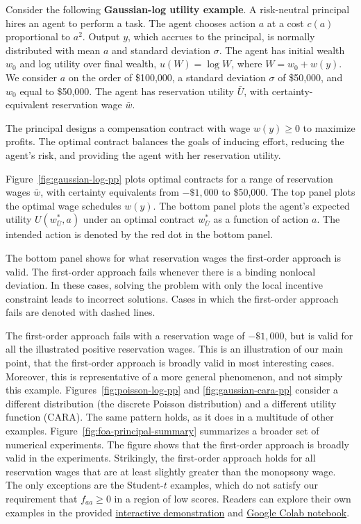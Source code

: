 Consider the following \textbf{Gaussian-log utility example}. A risk-neutral principal hires an agent to perform a task. The agent chooses action $a$ at a cost $c(a)$ proportional to $a^2$. Output $y$, which accrues to the principal, is normally distributed with mean $a$ and standard deviation $\sigma$. The agent has initial wealth $w_0$ and log utility over final wealth, $u(W)=\log W$, where $W=w_0+w(y)$. We consider $a$ on the order of \$100{,}000, a standard deviation $\sigma$ of \$50{,}000, and $w_0$ equal to \$50{,}000. The agent has reservation utility $\bar U$, with certainty-equivalent reservation wage $\bar w$.

The principal designs a compensation contract with wage $w(y) \geq 0$ to maximize profits. The optimal contract balances the goals of inducing effort, reducing the agent's risk, and providing the agent with her reservation utility.

Figure~\ref{fig:gaussian-log-pp} plots optimal contracts for a range of reservation wages $\bar w$, with certainty equivalents from $-\$1,000$ to \$50,000. The top panel plots the optimal wage schedules $w(y)$. The bottom panel plots the agent's expected utility $U(w^*_{\bar U},a)$ under an optimal contract $w^*_{\bar U}$ as a function of action $a$. The intended action is denoted by the red dot in the bottom panel.

The bottom panel shows for what reservation wages the first-order approach is valid. The first-order approach fails whenever there is a binding nonlocal deviation. In these cases, solving the problem with only the local incentive constraint leads to incorrect solutions. Cases in which the first-order approach fails are denoted with dashed lines.

The first-order approach fails with a reservation wage of $-\$1,000$, but is valid for all the illustrated positive reservation wages. This is an illustration of our main point, that the first-order approach is broadly valid in most interesting cases. Moreover, this is representative of a more general phenomenon, and not simply this example. Figures~\ref{fig:poisson-log-pp} and \ref{fig:gaussian-cara-pp} consider a different distribution (the discrete Poisson distribution) and a different utility function (CARA). The same pattern holds, as it does in a multitude of other examples. Figure~\ref{fig:foa-principal-summary} summarizes a broader set of numerical experiments. The figure shows that the first-order approach is broadly valid in the experiments. Strikingly, the first-order approach holds for all reservation wages that are at least slightly greater than the monopsony wage. The only exceptions are the Student-$t$ examples, which do not satisfy our requirement that $f_{aa}\geq0$ in a region of low scores. Readers can explore their own examples in the provided \href{https://eduardomazevedo.github.io/azevedo-wolff-2025-site/}{interactive demonstration} and \href{https://colab.research.google.com/github/eduardomazevedo/moralhazard/blob/main/examples/colab_demo.ipynb}{Google Colab notebook}.

